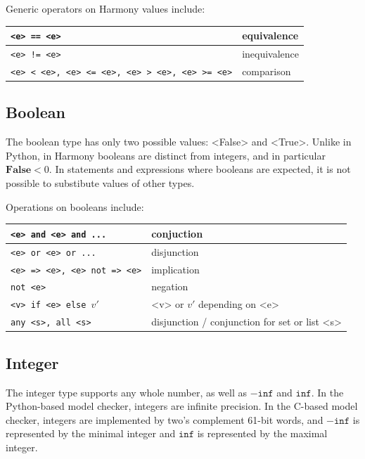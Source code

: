 \documentclass{report}
\begin{document}
{Generic operators on Harmony values include:

\begin{center}
\begin{tabular}{|l|l|}
\hline
\texttt{<{e}> == <{e}>} & equivalence \\
\hline
\texttt{<{e}> != <{e}>} & inequivalence \\
\hline
\texttt{<{e}> < <{e}>, <{e}> <= <{e}>, <{e}> > <{e}>, <{e}> >= <{e}>} & comparison\\
\hline
\end{tabular}
\end{center}

\subsection*{Boolean}

The boolean type has only two possible values: <{False}> and
<{True}>.  Unlike in Python, in Harmony booleans are distinct
from integers, and in particular $\mathbf{False} < 0$.  In statements
and expressions where booleans are expected, it is not possible to
substibute values of other types.

Operations on booleans include:
\begin{center}
\begin{tabular}{|l|l|}
\hline
\texttt{<{e}> and <{e}> and ...} & conjuction \\
\hline
\texttt{<{e}> or <{e}> or ...} & disjunction \\
\hline
\texttt{<{e}> => <{e}>, <{e}> not => <{e}>} & implication \\
\hline
\texttt{not <{e}>} & negation \\
\hline
\texttt{<{v}> if <{e}> else $v'$} & <{v}> or $v'$ depending on <{e}> \\
\hline
\texttt{any <{s}>, all <{s}>} & disjunction / conjunction for set or list <{s}> \\
\hline
\end{tabular}
\end{center}

\subsection*{Integer}

The integer type supports any whole number, as well as $-\mathtt{inf}$
and $\mathtt{inf}$.  In the Python-based model checker, integers are
infinite precision.  In the C-based model checker, integers are implemented
by two's complement 61-bit words, and $-\mathtt{inf}$ is represented by
the minimal integer and $\mathtt{inf}$ is represented by the maximal integer.

}
\end{document}
